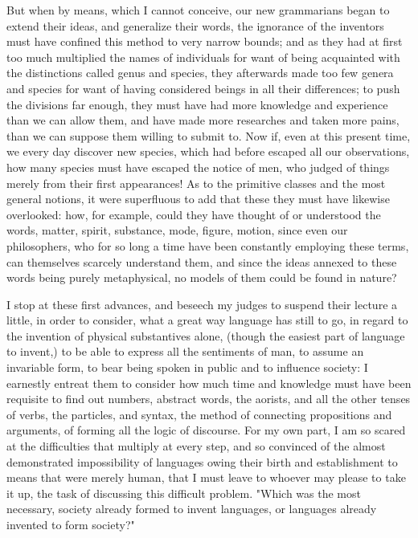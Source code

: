 \documentclass[11pt,twocolumn]{ltugboat}
\begin{document}
But when by means, which I cannot conceive, our new grammarians began
to extend their ideas, and generalize their words, the ignorance of
the inventors must have confined this method to very narrow bounds;
and as they had at first too much multiplied the names of individuals
for want of being acquainted with the distinctions called genus and
species, they afterwards made too few genera and species for want of
having considered beings in all their differences; to push the
divisions far enough, they must have had more knowledge and experience
than we can allow them, and have made more researches and taken more
pains, than we can suppose them willing to submit to. Now if, even at
this present time, we every day discover new species, which had before
escaped all our observations, how many species must have escaped the
notice of men, who judged of things merely from their first
appearances! As to the primitive classes and the most general notions,
it were superfluous to add that these they must have likewise
overlooked: how, for example, could they have thought of or understood
the words, matter, spirit, substance, mode, figure, motion, since even
our philosophers, who for so long a time have been constantly
employing these terms, can themselves scarcely understand them, and
since the ideas annexed to these words being purely metaphysical, no
models of them could be found in nature?

I stop at these first advances, and beseech my judges to suspend their
lecture a little, in order to consider, what a great way language has
still to go, in regard to the invention of physical substantives
alone, (though the easiest part of language to invent,) to be able to
express all the sentiments of man, to assume an invariable form, to
bear being spoken in public and to influence society: I earnestly
entreat them to consider how much time and knowledge must have been
requisite to find out numbers, abstract words, the aorists, and all
the other tenses of verbs, the particles, and syntax, the method of
connecting propositions and arguments, of forming all the logic of
discourse. For my own part, I am so scared at the difficulties that
multiply at every step, and so convinced of the almost demonstrated
impossibility of languages owing their birth and establishment to
means that were merely human, that I must leave to whoever may please
to take it up, the task of discussing this difficult problem. "Which
was the most necessary, society already formed to invent languages, or
languages already invented to form society?"
\end{document}
